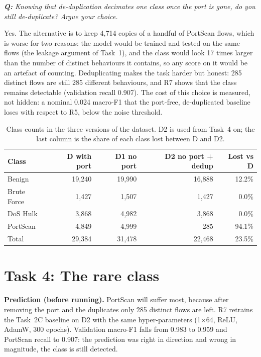 \documentclass[9pt]{extarticle}
\newcommand{\qa}[1]{\par\vspace{2pt}\noindent\textit{\textbf{Q:} #1}\par\nopagebreak\noindent}
\newcommand{\run}[1]{\textsf{#1}}   %
\begin{document}
\qa{Knowing that de-duplication decimates one class once the port is gone, do you still de-duplicate?
Argue your choice.}
Yes. The alternative is to keep 4,714 copies of a handful of PortScan flows, which is worse for two
reasons: the model would be trained and tested on the same flows (the leakage argument of Task~1),
and the class would look 17 times larger than the number of distinct behaviours it contains, so any
score on it would be an artefact of counting. Deduplicating makes the task harder but honest: 285
distinct flows are still 285 different behaviours, and \run{R7} shows that the class remains
detectable (validation recall 0.907). The cost of this choice is measured, not hidden: a nominal
0.024 macro-F1 that the port-free, de-duplicated baseline loses with respect to \run{R5}, below the
noise threshold.

\begin{table}[htbp]
\centering\small
\caption{Class counts in the three versions of the dataset. \run{D2} is used from Task~4 on; the
last column is the share of each class lost between \run{D} and \run{D2}.}
\label{tab:t3}
\begin{tabular}{@{}lrrrr@{}}
\toprule
Class & \run{D} with port & \run{D1} no port & \run{D2} no port + dedup & Lost vs \run{D}\\
\midrule
Benign       & 19,240 & 19,990 & 16,888 & 12.2\%\\
Brute Force  &  1,427 &  1,507 &  1,427 &  0.0\%\\
DoS Hulk     &  3,868 &  4,982 &  3,868 &  0.0\%\\
PortScan     &  4,849 &  4,999 &    285 & 94.1\%\\
\midrule
Total        & 29,384 & 31,478 & 22,468 & 23.5\%\\
\bottomrule
\end{tabular}
\end{table}

\section{Task 4: The rare class}

\textbf{Prediction (before running).} PortScan will suffer most, because after removing the port and
the duplicates only 285 distinct flows are left. \run{R7} retrains the Task~2C baseline on \run{D2}
with the same hyper-parameters (1$\times$64, ReLU, AdamW, 300 epochs). Validation macro-F1 falls
from 0.983 to 0.959 and PortScan recall to 0.907: the prediction was right in direction and wrong
in magnitude, the class is still detected.
\end{document}
